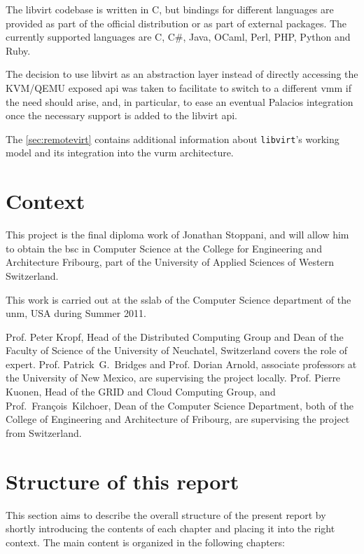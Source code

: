 The libvirt codebase is written in C, but bindings for different languages are provided as part of the official distribution or as part of external packages. The currently supported languages are C, C\#, Java, OCaml, Perl, PHP, Python and Ruby.

The decision to use libvirt as an abstraction layer instead of directly accessing the KVM/QEMU exposed \gls{api} was taken to facilitate to switch to a different \gls{vmm} if the need should arise, and, in particular, to ease an eventual Palacios integration once the necessary support is added to the libvirt \gls{api}.

The \autoref{sec:remotevirt} contains additional information about \texttt{libvirt}'s working model and its integration into the \gls{vurm} architecture.



\section{Context}
\label{sec:context}

This project is the final diploma work of Jonathan Stoppani, and will allow him to obtain the \gls{bsc} in Computer Science at the College for Engineering and Architecture Fribourg, part of the University of Applied Sciences of Western Switzerland.

This work is carried out at the \gls{sslab} of the Computer Science department of the \gls{unm}, USA during Summer 2011.

Prof. Peter Kropf, Head of the Distributed Computing Group and Dean of the Faculty of Science of the University of Neuchatel, Switzerland covers the role of expert. Prof. Patrick~G.~Bridges and Prof. Dorian Arnold, associate professors at the University of New Mexico, are supervising the project locally. Prof. Pierre Kuonen, Head of the GRID and Cloud Computing Group, and Prof.~François~Kilchoer, Dean of the Computer Science Department, both of the College of Engineering and Architecture of Fribourg, are supervising the project from Switzerland.


\section{Structure of this report}
\label{sec:structure}

This section aims to describe the overall structure of the present report by shortly introducing the contents of each chapter and placing it into the right context. The main content is organized in the following chapters:

